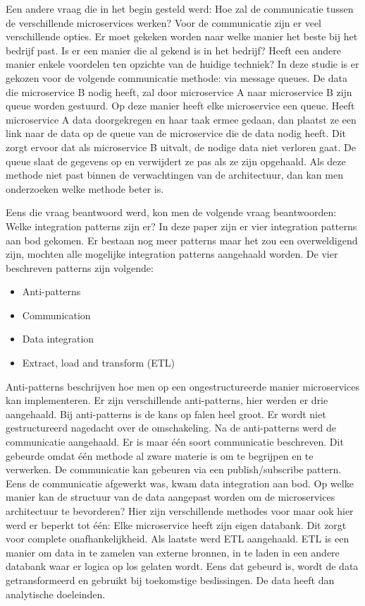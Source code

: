 Een andere vraag die in het begin gesteld werd: Hoe zal de communicatie tussen de verschillende microservices werken?
Voor de communicatie zijn er veel verschillende opties. Er moet gekeken worden naar welke manier het beste bij het bedrijf past. Is er een manier die al gekend is in het bedrijf? Heeft een andere manier enkele voordelen ten opzichte van de huidige techniek? In deze studie is er gekozen voor de volgende communicatie methode: via message queues. De data die microservice B nodig heeft, zal door microservice A naar microservice B zijn queue worden gestuurd. Op deze manier heeft elke microservice een queue. Heeft microservice A data doorgekregen en haar taak ermee gedaan, dan plaatst ze een link naar de data op de queue van de microservice die de data nodig heeft. Dit zorgt ervoor dat als microservice B uitvalt, de nodige data niet verloren gaat. De queue slaat de gegevens op en verwijdert ze pas als ze zijn opgehaald. Als deze methode niet past binnen de verwachtingen van de architectuur, dan kan men onderzoeken welke methode beter is. 

Eens die vraag beantwoord werd, kon men de volgende vraag beantwoorden: Welke integration patterns zijn er?
In deze paper zijn er vier integration patterns aan bod gekomen. Er bestaan nog meer patterns maar het zou een overweldigend zijn, mochten alle mogelijke integration patterns aangehaald worden. De vier beschreven patterns zijn volgende:
\begin{itemize}
	\item Anti-patterns
	\item Communication
	\item Data integration
	\item Extract, load and transform (ETL)
\end{itemize}
Anti-patterns beschrijven hoe men op een ongestructureerde manier microservices kan implementeren. Er zijn verschillende anti-patterns, hier werden er drie aangehaald. Bij anti-patterns is de kans op falen heel groot. Er wordt niet gestructureerd nagedacht over de omschakeling.
Na de anti-patterns werd de communicatie aangehaald. Er is maar één soort communicatie beschreven. Dit gebeurde omdat één methode al zware materie is om te begrijpen en te verwerken. De communicatie kan gebeuren via een publish/subscribe pattern.
Eens de communicatie afgewerkt was, kwam data integration aan bod. Op welke manier kan de structuur van de data aangepast worden om de microservices architectuur te bevorderen? Hier zijn verschillende methodes voor maar ook hier werd er beperkt tot één: Elke microservice heeft zijn eigen databank. Dit zorgt voor complete onafhankelijkheid.
Als laatste werd ETL aangehaald. ETL is een manier om data in te zamelen van externe bronnen, in te laden in een andere databank waar er logica op los gelaten wordt. Eens dat gebeurd is, wordt de data getransformeerd en gebruikt bij toekomstige beslissingen. De data heeft dan analytische doeleinden.

